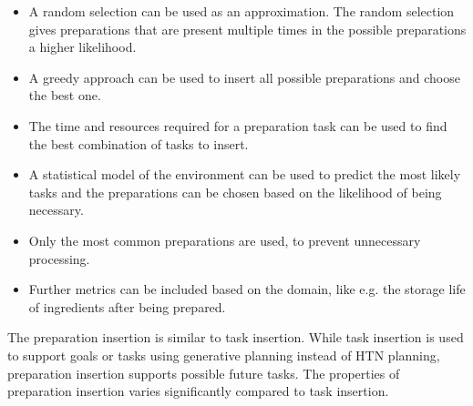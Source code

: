 \begin{itemize}
  \item A random selection can be used as an approximation.
    The random selection gives preparations that are present multiple times in the possible preparations a higher likelihood.
  \item A greedy approach can be used to insert all possible preparations and choose the best one.
  \item The time and resources required for a preparation task can be used to find the best combination of tasks to insert.
  \item A statistical model of the environment can be used to predict the most likely tasks and the preparations can be chosen based on the likelihood of being necessary.
  \item Only the most common preparations are used, to prevent unnecessary processing.
  \item Further metrics can be included based on the domain, like e.g. the storage life of ingredients after being prepared.
\end{itemize}

The preparation insertion is similar to task insertion.
While task insertion is used to support goals or tasks using generative planning instead of HTN planning, preparation insertion supports possible future tasks.
The properties of preparation insertion varies significantly compared to task insertion.